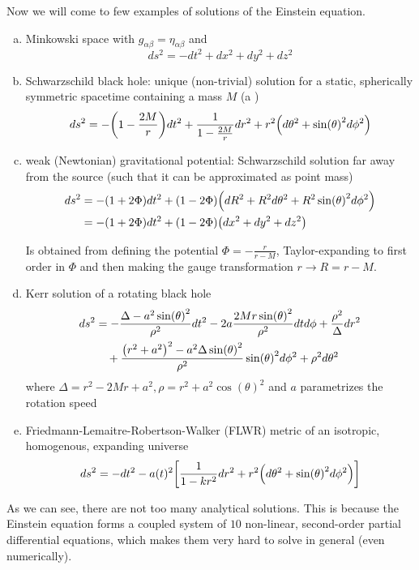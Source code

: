 Now we will come to few examples of solutions of the Einstein equation.%
\begin{ex}
\begin{enumerate}[(a)]
\item Minkowski space with $g_{\alpha \beta} = \eta_{\alpha \beta}$ and
\begin{equation}
ds^2 = - dt^2 + dx^2 + dy^2 + dz^2
\end{equation}


\item Schwarzschild black hole: unique (non-trivial) solution for a static, spherically symmetric spacetime containing a mass $M$ (a )
\begin{equation}
ds^2 = - \qty(1 - \frac{2 M}{r}) dt^2 + \frac{1}{1 - \frac{2 M}{r}} dr^2 + r^2 \qty(d\theta^2 + \sin(\theta)^2 d\phi^2)
\end{equation}


\item weak (Newtonian) gravitational potential: Schwarzschild solution far away from the source (such that it can be approximated as point mass)
\begin{align}
ds^2 &= - \qty(1 + 2 \Phi) dt^2 + \qty(1 - 2 \Phi) \qty(dR^2 + R^2 d\theta^2 + R^2 \sin(\theta)^2 d\phi^2)
\\
&= - \qty(1 + 2 \Phi) dt^2 + \qty(1 - 2 \Phi) \qty(dx^2 + dy^2 + dz^2)
\end{align}

Is obtained from defining the potential $\Phi = - \frac{r}{r - M}$, Taylor-expanding to first order in $\Phi$ and then making the gauge transformation $r \rightarrow R = r - M$.


\item Kerr solution of a rotating black hole
\begin{equation}
\begin{split}
ds^2 &= - \frac{\Delta - a^2 \sin(\theta)^2}{\rho^2} dt^2 - 2 a \frac{2 M r \sin(\theta)^2}{\rho^2} dt d\phi + \frac{\rho^2}{\Delta} dr^2
\\
&\quad + \frac{\qty(r^2 + a^2)^2 - a^2 \Delta \sin(\theta)^2}{\rho^2} \sin(\theta)^2 d\phi^2 + \rho^2 d\theta^2
\end{split}
\end{equation}
where $\Delta = r^2 - 2 M r + a^2, \rho = r^2 + a^2 \cos(\theta)^2$ and $a$ parametrizes the rotation speed


\item Friedmann-Lemaitre-Robertson-Walker (FLWR) metric of an isotropic, homogenous, expanding universe
\begin{equation}
ds^2 = - dt^2 - a(t)^2 \qty[\frac{1}{1 - k r^2} dr^2 + r^2 \qty(d\theta^2 + \sin(\theta)^2 d\phi^2)]
\end{equation}
\end{enumerate}
\end{ex}
As we can see, there are not too many analytical solutions. This is because the Einstein equation forms a coupled system of $10$ non-linear, second-order partial differential equations, which makes them very hard to solve in general (even numerically).



